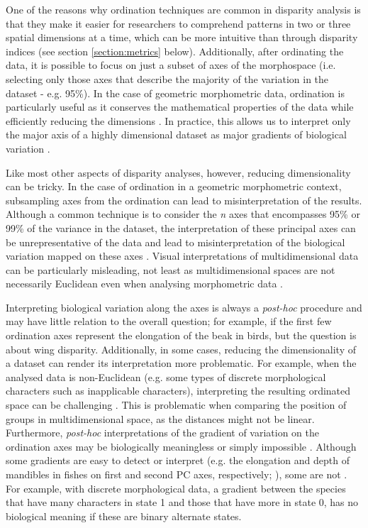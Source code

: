 \documentclass[12pt,letterpaper]{article}
\begin{document}
One of the reasons why ordination techniques are common in disparity analysis is that they make it easier for researchers to comprehend patterns in two or three spatial dimensions at a time, which can be more intuitive than through disparity indices (see section \ref{section:metrics} below).
Additionally, after ordinating the data, it is possible to focus on just a subset of axes of the morphospace (i.e. selecting only those axes that describe the majority of the variation in the dataset - e.g. 95\%).
In the case of geometric morphometric data, ordination is particularly useful as it conserves the mathematical properties of the data while efficiently reducing the dimensions \citep{Legendre2012-va,dryden2016statistical}.
In practice, this allows us to interpret only the major axis of a highly dimensional dataset as major gradients of biological variation \citep[e.g. the elongation and flattening of birds beaks;][]{Cooney2017-ly}.

Like most other aspects of disparity analyses, however, reducing dimensionality can be tricky.
In the case of ordination in a geometric morphometric context, subsampling axes from the ordination can lead to misinterpretation of the results. 
Although a common technique is to consider the \textit{n} axes that encompasses 95\% or 99\% of the variance in the dataset, the interpretation of these principal axes can be unrepresentative of the data and lead to misinterpretation of the biological variation mapped on these axes \citep{Bookstein2015-yy, Bookstein2017-qk, Bookstein2017-gu,Weisbecker2019-kp}.
Visual interpretations of multidimensional data can be particularly misleading, not least as multidimensional spaces are not necessarily Euclidean even when analysing morphometric data \citep{Deline2018-le, Gerber2017-xi}.

Interpreting biological variation along the axes is always a \textit{post-hoc} procedure and may have little relation to the overall question; for example, if the first few ordination axes represent the elongation of the beak in birds, but the question is about wing disparity.
Additionally, in some cases, reducing the dimensionality of a dataset can render its interpretation more problematic.
For example, when the analysed data is non-Euclidean (e.g. some types of discrete morphological characters such as inapplicable characters), interpreting the resulting ordinated space can be challenging \citep{Gerber2019}.
This is problematic when comparing the position of groups in multidimensional space, as the distances might not be linear.
Furthermore, \textit{post-hoc} interpretations of the gradient of variation on the ordination axes may be biologically meaningless or simply impossible \citep{Gerber2019}.
Although some gradients are easy to detect or interpret (e.g. the elongation and depth of mandibles in fishes on first and second PC axes, respectively; \citealt{Hill2018-ye}), some are not \citep[e.g.][]{Weisbecker2019-kp}.
For example, with discrete morphological data, a gradient between the species that have many characters in state 1 and those that have more in state 0, has no biological meaning if these are binary alternate states.
\end{document}
